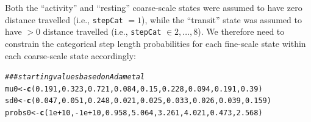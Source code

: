 \documentclass[12pt]{article}\usepackage[]{graphicx}\usepackage[]{xcolor}
\makeatletter
\newcommand{\hlnum}[1]{\textcolor[rgb]{0.686,0.059,0.569}{#1}}%
\newcommand{\hlcom}[1]{\textcolor[rgb]{0.678,0.584,0.686}{\textit{#1}}}%
\newcommand{\hlopt}[1]{\textcolor[rgb]{0,0,0}{#1}}%
\newcommand{\hldef}[1]{\textcolor[rgb]{0.345,0.345,0.345}{#1}}%
\newcommand{\hlkwb}[1]{\textcolor[rgb]{0.69,0.353,0.396}{#1}}%
\newcommand{\hlkwd}[1]{\textcolor[rgb]{0.737,0.353,0.396}{\textbf{#1}}}%
\newenvironment{kframe}{%
 \def\at@end@of@kframe{}%
 \ifinner\ifhmode%
  \def\at@end@of@kframe{\end{minipage}}%
  \begin{minipage}{\columnwidth}%
 \fi\fi%
 \def\FrameCommand##1{\hskip\@totalleftmargin \hskip-\fboxsep
 \colorbox{shadecolor}{##1}\hskip-\fboxsep
     \hskip-\linewidth \hskip-\@totalleftmargin \hskip\columnwidth}%
 \MakeFramed {\advance\hsize-\width
   \@totalleftmargin\z@ \linewidth\hsize
   \@setminipage}}%
 {\par\unskip\endMakeFramed%
 \at@end@of@kframe}
\newenvironment{knitrout}{}{} %
\makeatother
\begin{document}
Both the ``activity'' and ``resting'' coarse-scale states were assumed to have zero distance travelled (i.e., \verb|stepCat| $=1$), while the ``transit'' state was assumed to have $>0$ distance travelled (i.e., \verb|stepCat| $\in{2,\ldots,8}$). We therefore need to constrain the categorical step length probabilities for each fine-scale state within each coarse-scale state accordingly:
\begin{knitrout}
\color{fgcolor}\begin{kframe}
\begin{alltt}
\hlcom{### starting values based on Adam et al}
\hldef{mu0} \hlkwb{<-} \hlkwd{c}\hldef{(}\hlnum{0.191}\hldef{,} \hlnum{0.323}\hldef{,} \hlnum{0.721}\hldef{,} \hlnum{0.084}\hldef{,} \hlnum{0.15}\hldef{,} \hlnum{0.228}\hldef{,} \hlnum{0.094}\hldef{,} \hlnum{0.191}\hldef{,} \hlnum{0.39}\hldef{)}
\hldef{sd0} \hlkwb{<-} \hlkwd{c}\hldef{(}\hlnum{0.047}\hldef{,} \hlnum{0.051}\hldef{,} \hlnum{0.248}\hldef{,} \hlnum{0.021}\hldef{,} \hlnum{0.025}\hldef{,} \hlnum{0.033}\hldef{,} \hlnum{0.026}\hldef{,} \hlnum{0.039}\hldef{,} \hlnum{0.159}\hldef{)}
\hldef{probs0} \hlkwb{<-} \hlkwd{c}\hldef{(}\hlnum{1e+10}\hldef{,} \hlopt{-}\hlnum{1e+10}\hldef{,} \hlnum{0.958}\hldef{,} \hlnum{5.064}\hldef{,} \hlnum{3.261}\hldef{,} \hlnum{4.021}\hldef{,} \hlnum{0.473}\hldef{,} \hlnum{2.568}\hldef{)}


\end{alltt}
\end{kframe}
\end{knitrout}
\end{document}
